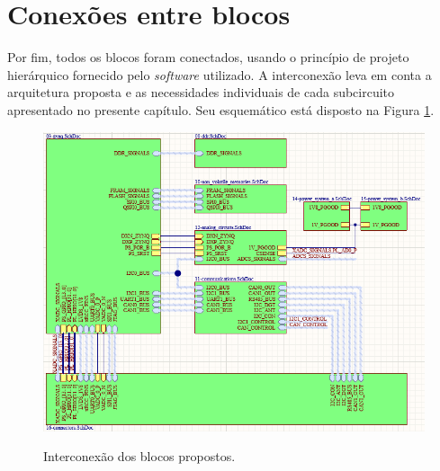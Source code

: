 \section{Conexões entre blocos}

Por fim, todos os blocos foram conectados, usando o princípio de projeto hierárquico fornecido pelo \textit{software} utilizado. A interconexão leva em conta a arquitetura proposta e as necessidades individuais de cada subcircuito apresentado no presente capítulo. Seu esquemático está disposto na Figura \ref{fig:inter}.

\begin{figure}[H]
    \centering
    \caption{Interconexão dos blocos propostos.}
    \includegraphics[scale=0.7]{images/conexoes.png}
    \label{fig:inter}
\end{figure}
